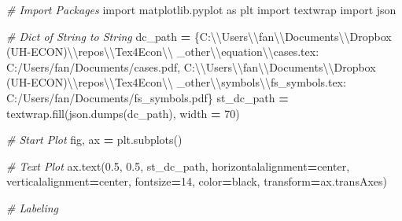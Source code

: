 \documentclass[
]{book}
\newenvironment{Shaded}{\begin{snugshade}}{\end{snugshade}}
\newcommand{\CharTok}[1]{\textcolor[rgb]{0.31,0.60,0.02}{#1}}
\newcommand{\CommentTok}[1]{\textcolor[rgb]{0.56,0.35,0.01}{\textit{#1}}}
\newcommand{\DecValTok}[1]{\textcolor[rgb]{0.00,0.00,0.81}{#1}}
\newcommand{\FloatTok}[1]{\textcolor[rgb]{0.00,0.00,0.81}{#1}}
\newcommand{\ImportTok}[1]{#1}
\newcommand{\NormalTok}[1]{#1}
\newcommand{\OperatorTok}[1]{\textcolor[rgb]{0.81,0.36,0.00}{\textbf{#1}}}
\newcommand{\StringTok}[1]{\textcolor[rgb]{0.31,0.60,0.02}{#1}}
\begin{document}
\begin{Shaded}
\begin{Highlighting}[]
\CommentTok{\# Import Packages}
\ImportTok{import}\NormalTok{ matplotlib.pyplot }\ImportTok{as}\NormalTok{ plt}
\ImportTok{import}\NormalTok{ textwrap}
\ImportTok{import}\NormalTok{ json}

\CommentTok{\# Dict of String to String}
\NormalTok{dc\_path }\OperatorTok{=}\NormalTok{ \{}\StringTok{\textquotesingle{}C:}\CharTok{\textbackslash{}\textbackslash{}}\StringTok{Users}\CharTok{\textbackslash{}\textbackslash{}}\StringTok{fan}\CharTok{\textbackslash{}\textbackslash{}}\StringTok{Documents}\CharTok{\textbackslash{}\textbackslash{}}\StringTok{Dropbox (UH{-}ECON)}\CharTok{\textbackslash{}\textbackslash{}}\StringTok{repos}\CharTok{\textbackslash{}\textbackslash{}}\StringTok{Tex4Econ}\CharTok{\textbackslash{}\textbackslash{}}\StringTok{\textquotesingle{}}
           \StringTok{\textquotesingle{}\_other}\CharTok{\textbackslash{}\textbackslash{}}\StringTok{equation}\CharTok{\textbackslash{}\textbackslash{}}\StringTok{cases.tex\textquotesingle{}}\NormalTok{:}
               \StringTok{\textquotesingle{}C:/Users/fan/Documents/cases.pdf\textquotesingle{}}\NormalTok{,}
           \StringTok{\textquotesingle{}C:}\CharTok{\textbackslash{}\textbackslash{}}\StringTok{Users}\CharTok{\textbackslash{}\textbackslash{}}\StringTok{fan}\CharTok{\textbackslash{}\textbackslash{}}\StringTok{Documents}\CharTok{\textbackslash{}\textbackslash{}}\StringTok{Dropbox (UH{-}ECON)}\CharTok{\textbackslash{}\textbackslash{}}\StringTok{repos}\CharTok{\textbackslash{}\textbackslash{}}\StringTok{Tex4Econ}\CharTok{\textbackslash{}\textbackslash{}}\StringTok{\textquotesingle{}}
           \StringTok{\textquotesingle{}\_other}\CharTok{\textbackslash{}\textbackslash{}}\StringTok{symbols}\CharTok{\textbackslash{}\textbackslash{}}\StringTok{fs\_symbols.tex\textquotesingle{}}\NormalTok{:}
               \StringTok{\textquotesingle{}C:/Users/fan/Documents/fs\_symbols.pdf\textquotesingle{}}\NormalTok{\}}
\NormalTok{st\_dc\_path }\OperatorTok{=}\NormalTok{ textwrap.fill(json.dumps(dc\_path), width }\OperatorTok{=} \DecValTok{70}\NormalTok{)}

\CommentTok{\# Start Plot}
\NormalTok{fig, ax }\OperatorTok{=}\NormalTok{ plt.subplots()}

\CommentTok{\# Text Plot}
\NormalTok{ax.text(}\FloatTok{0.5}\NormalTok{, }\FloatTok{0.5}\NormalTok{, st\_dc\_path,}
\NormalTok{        horizontalalignment}\OperatorTok{=}\StringTok{\textquotesingle{}center\textquotesingle{}}\NormalTok{,}
\NormalTok{        verticalalignment}\OperatorTok{=}\StringTok{\textquotesingle{}center\textquotesingle{}}\NormalTok{,}
\NormalTok{        fontsize}\OperatorTok{=}\DecValTok{14}\NormalTok{, color}\OperatorTok{=}\StringTok{\textquotesingle{}black\textquotesingle{}}\NormalTok{,}
\NormalTok{        transform}\OperatorTok{=}\NormalTok{ax.transAxes)}

\CommentTok{\# Labeling}
\end{Highlighting}
\end{Shaded}
\end{document}
